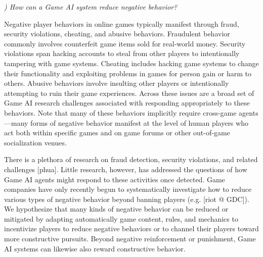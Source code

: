 \documentclass[conference]{IEEEtran}
\newcounter{questionno}
\newcommand{\subsubsectionx}[1]{{\em {\arabic{questionno}) #1}}
	\addtocounter{questionno}{1}
	}
\begin{document}
\subsubsectionx{How can a Game AI system reduce negative behavior?}
%
Negative player behaviors in online games typically manifest through fraud, security violations, cheating, and abusive behaviors. 
Fraudulent behavior commonly involves counterfeit game items sold for real-world money. 
Security violations span hacking accounts to steal from other players to intentionally tampering with game systems. 
Cheating includes hacking game systems to change their functionality and exploiting problems in games for person gain or harm to others. Abusive behaviors involve insulting other players or intentionally attempting to ruin their game experiences. 
Across these issues are a broad set of Game AI research challenges associated with responding appropriately to these behaviors. 
Note that many of these behaviors implicitly require cross-game agents---many forms of negative behavior manifest at the level of human players who act both within specific games and on game forums or other out-of-game socialization venues.

There is a plethora of research on fraud detection, security violations, and related challenges [phua]. 
Little research, however, has addressed the questions of how Game AI agents might respond to these activities once detected. 
Game companies have only recently begun to systematically investigate how to reduce various types of negative behavior beyond banning players (e.g. [riot @ GDC]). 
%
%
We hypothesize that many kinds of negative behavior can be reduced or mitigated by adapting automatically game content, rules, and mechanics to incentivize players to reduce negative behaviors or to channel their players toward more constructive pursuits. 
Beyond negative reinforcement or punishment, Game AI systems can likewise also reward constructive behavior.
\end{document}

